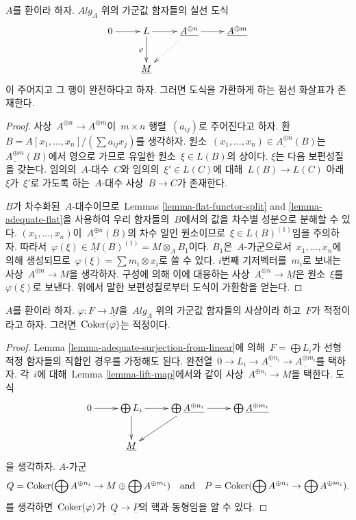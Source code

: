 \begin{lemma}
\label{lemma-lift-map}
$A$를 환이라 하자. $\textit{Alg}_A$ 위의 가군값 함자들의 실선 도식
$$
\xymatrix{
0 \ar[r] &
L \ar[d]_\varphi \ar[r] &
\underline{A^{\oplus n}} \ar[r] \ar@{..>}[ld] &
\underline{A^{\oplus m}} \\
& \underline{M}
}
$$
이 주어지고 그 행이 완전하다고 하자. 그러면 도식을 가환하게 하는
점선 화살표가 존재한다.
\end{lemma}

\begin{proof}
사상\  $A^{\oplus n} \to A^{\oplus m}$이\  $m \times n$ 행렬\ 
$(a_{ij})$로 주어진다고 하자. 환\ 
$B = A[x_1, \ldots, x_n]/(\sum a_{ij}x_j)$를 생각하자. 원소\ 
$(x_1, \ldots, x_n) \in \underline{A^{\oplus n}}(B)$는\ 
$\underline{A^{\oplus m}}(B)$에서 영으로 가므로 유일한 원소\ 
$\xi \in L(B)$의 상이다. $\xi$는 다음 보편성질을 갖는다. 임의의\ 
$A$-대수\  $C$와 임의의\  $\xi' \in L(C)$에 대해\  $L(B) \to L(C)$ 아래\ 
$\xi$가\  $\xi'$로 가도록 하는\  $A$-대수 사상\  $B \to C$가 존재한다.

\medskip\noindent
$B$가 차수화된\  $A$-대수이므로\  Lemmas
\ref{lemma-flat-functor-split} and \ref{lemma-adequate-flat}을 사용하여
우리 함자들의\  $B$에서의 값을 차수별 성분으로 분해할 수 있다.
$(x_1, \ldots, x_n)$이\  $\underline{A^{\oplus n}}(B)$의 차수 일인
원소이므로\  $\xi \in L(B)^{(1)}$임을 주의하자. 따라서\ 
$\varphi(\xi) \in \underline{M}(B)^{(1)} = M \otimes_A B_1$이다.
$B_1$은\  $A$-가군으로서\  $x_1, \ldots, x_n$에 의해 생성되므로\ 
$\varphi(\xi) = \sum m_i \otimes x_i$로 쓸 수 있다. $i$번째
기저벡터를\  $m_i$로 보내는 사상\  $A^{\oplus n} \to M$을 생각하자.
구성에 의해 이에 대응하는 사상\ 
$\underline{A^{\oplus n}} \to \underline{M}$은 원소\  $\xi$를\ 
$\varphi(\xi)$로 보낸다. 위에서 말한 보편성질로부터 도식이 가환함을
얻는다.
\end{proof}

\begin{lemma}
\label{lemma-cokernel-into-module}
$A$를 환이라 하자.
$\varphi : F \to \underline{M}$을\  $\textit{Alg}_A$ 위의 가군값 함자들의
사상이라 하고\  $F$가 적정이라고 하자. 그러면\  $\mathop{\mathrm{Coker}}(\varphi)$는
적정이다.
\end{lemma}

\begin{proof}
Lemma \ref{lemma-adequate-surjection-from-linear}에 의해\ 
$F = \bigoplus L_i$가 선형 적정 함자들의 직합인 경우를 가정해도 된다.
완전열\ 
$0 \to L_i \to \underline{A^{\oplus n_i}} \to \underline{A^{\oplus m_i}}$를
택하자. 각\  $i$에 대해\  Lemma \ref{lemma-lift-map}에서와 같이 사상\ 
$A^{\oplus n_i} \to M$을 택한다. 도식
$$
\xymatrix{
0 \ar[r] &
\bigoplus L_i  \ar[r] \ar[d] &
\bigoplus \underline{A^{\oplus n_i}} \ar[r] \ar[ld] &
\bigoplus \underline{A^{\oplus m_i}} \\
& \underline{M}
}
$$
을 생각하자. $A$-가군
$$
Q =
\mathop{\mathrm{Coker}}(\bigoplus A^{\oplus n_i} \to M \oplus \bigoplus A^{\oplus m_i})
\quad\text{and}\quad
P = \mathop{\mathrm{Coker}}(\bigoplus A^{\oplus n_i} \to \bigoplus A^{\oplus m_i}).
$$
를 생각하면\  $\mathop{\mathrm{Coker}}(\varphi)$가\ 
$\underline{Q} \to \underline{P}$의 핵과 동형임을 알 수 있다.
\end{proof}

